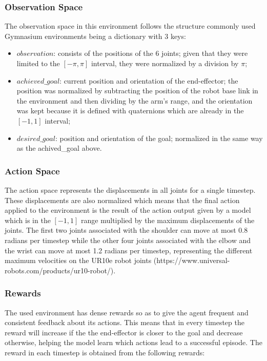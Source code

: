 \subsubsection{Observation Space}

The observation space in this environment follows the structure commonly used Gymnasium environments being a dictionary with 3 keys:

\begin{itemize}
    \item $observation$: consists of the positions of the 6 joints; given that they were limited to the $[-\pi, \pi]$ interval, they were normalized by a division by $\pi$;
    \item $achieved\_goal$: current position and orientation of the end-effector; the position was normalized by subtracting the position of the robot base link in the environment and then dividing by the arm's range, and the orientation was kept because it is defined with quaternions which are already in the $[-1, 1]$ interval;
    \item $desired\_goal$: position and orientation of the goal; normalized in the same way as the achived\_goal above.
\end{itemize}

\subsubsection{Action Space}

The action space represents the displacements in all joints for a single timestep. These displacements are also normalized which means that the final action applied to the environment is the result of the action output given by a model which is in the $[-1, 1]$ range multiplied by the maximum displacements of the joints. The first two joints associated with the shoulder can move at most 0.8 radians per timestep while the other four joints associated with the elbow and the wrist can move at most 1.2 radians per timestep, representing the different maximum velocities on the UR10e robot joints (https://www.universal-robots.com/products/ur10-robot/).

\subsubsection{Rewards}

The used environment has dense rewards so as to give the agent frequent and consistent feedback about its actions. This means that in every timestep the reward will increase if the the end-effector is closer to the goal and decrease otherwise, helping the model learn which actions lead to a successful episode. The reward in each timestep is obtained from the following rewards:

